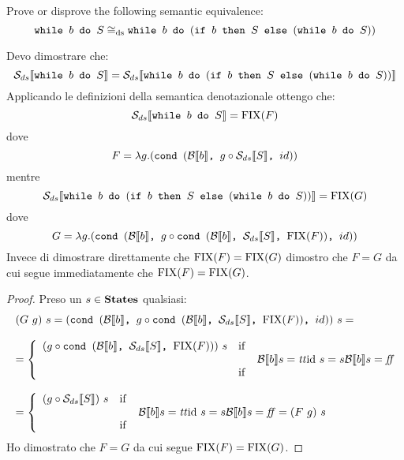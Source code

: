 {Prove or disprove the following semantic equivalence:
$$
\wbS{b}{S} \eqDS \wbS{b}{(\ifABC{b}{S}{(\wbS{b}{S})})}
$$	
}
{
Devo dimostrare che:
$$
\dsCtxt{\wbS{b}{S}} = \dsCtxt{\wbS{b}{(\ifABC{b}{S}{(\wbS{b}{S})})}}
$$	
Applicando le definizioni della semantica denotazionale ottengo che:
$$
\dsCtxt{\wbS{b}{S}} = \fixp{F}
$$
dove 
$$
F = \lambda g. (\cond{b}{g \circ \dsCtxt{S}}{id})
$$
mentre
$$
\dsCtxt{\wbS{b}{(\ifABC{b}{S}{(\wbS{b}{S})})}} = \fixp{G}
$$
dove
$$
G = \lambda g .(\cond{b}{g \circ \cond{b}{\dsCtxt{S}}{\fixp{F}}}{id})
$$
Invece di dimostrare direttamente che $\fixp{F} = \fixp{G}$ dimostro 
che $F = G$ da cui segue immediatamente che $\fixp{F} = \fixp{G}$.

\begin{proof}
Preso un $s \in \states$ qualsiasi:
$$
\begin{array}{l}
(G\ g)\ s =
(\cond{b}{g \circ \cond{b}{\dsCtxt{S}}{\fixp{F}}}{id})\ s =\\
\\
= \caseFun{(g \circ \cond{b}{\dsCtxt{S}}{\fixp{F}})\ s}
          {\B{b} =\semtrue}
          {\idDS\ s = s}
          {\B{b} = \semfalse} \\
\\
= \caseFun{(g \circ \dsCtxt{S})\ s}
          {\B{b} = \semtrue}
          {\idDS\ s = s}
          {\B{b} = \semfalse} =
(F\ g)\ s
\end{array}
$$ 
Ho dimostrato che $F = G$ da cui segue $\fixp{F} = \fixp{G}$.
\end{proof}
	
}

